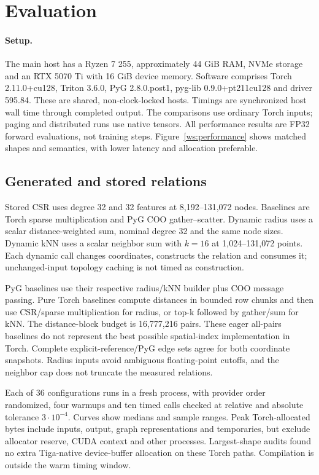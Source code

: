 \section{Evaluation}
\label{ws:evaluation}
\paragraph{Setup.}
The main host has a Ryzen 7 255, approximately 44 GiB RAM, NVMe storage and an
RTX 5070 Ti with 16 GiB device memory. Software comprises Torch 2.11.0+cu128,
Triton 3.6.0, PyG 2.8.0.post1, pyg-lib 0.9.0+pt211cu128 and driver 595.84.
These are shared, non-clock-locked hosts. Timings are synchronized host wall
time through completed output. The comparisons use ordinary Torch inputs;
paging and distributed runs use native tensors. All performance results are
FP32 forward evaluations, not training steps. Figure~\ref{ws:performance}
shows matched shapes and semantics, with lower latency and allocation preferable.

\subsection{Generated and stored relations}
Stored CSR uses degree 32 and 32 features at 8,192--131,072 nodes. Baselines
are Torch sparse multiplication and PyG COO gather--scatter. Dynamic radius
uses a scalar distance-weighted sum, nominal degree 32 and the same node sizes.
Dynamic kNN uses a scalar neighbor sum with $k=16$ at 1,024--131,072 points.
Each dynamic call changes coordinates, constructs the relation and consumes
it; unchanged-input topology caching is not timed as construction.

PyG baselines use their respective radius/kNN builder plus COO message passing.
Pure Torch baselines compute distances in bounded row chunks and then use
CSR/sparse multiplication for radius, or top-k followed by gather/sum for kNN.
The distance-block budget is 16,777,216 pairs. These eager all-pairs baselines
do not represent the best possible spatial-index implementation in Torch.
Complete explicit-reference/PyG edge sets agree for both coordinate snapshots.
Radius inputs avoid ambiguous floating-point cutoffs, and the neighbor cap
does not truncate the measured relations.

Each of 36 configurations runs in a fresh process, with provider order
randomized, four warmups and ten timed calls checked at relative and absolute
tolerance $3\cdot10^{-4}$. Curves show medians and sample ranges. Peak
Torch-allocated bytes include inputs, output, graph representations and
temporaries, but exclude allocator reserve, CUDA context and other processes.
Largest-shape audits found no extra Tiga-native device-buffer allocation on
these Torch paths. Compilation is outside the warm timing window.

